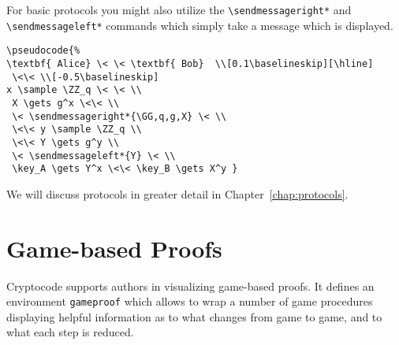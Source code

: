 \documentclass[a4paper]{report}
\begin{document}
For basic protocols you might also utilize the \lstinline$\sendmessageright*$ and \lstinline$\sendmessageleft*$
commands which simply take a message which is displayed.
\begin{center}
\end{center}
\begin{lstlisting}
\pseudocode{%
\textbf{ Alice} \< \< \textbf{ Bob}  \\[0.1\baselineskip][\hline]
 \<\< \\[-0.5\baselineskip]
x \sample \ZZ_q \< \< \\
 X \gets g^x \<\< \\
 \< \sendmessageright*{\GG,q,g,X} \< \\
 \<\< y \sample \ZZ_q \\
 \<\< Y \gets g^y \\
 \< \sendmessageleft*{Y} \< \\
 \key_A \gets Y^x \<\< \key_B \gets X^y }
\end{lstlisting}
We will discuss protocols in greater detail in Chapter~\ref{chap:protocols}.

\section{Game-based Proofs}
Cryptocode supports authors in visualizing game-based proofs. It defines an environment
\lstinline$gameproof$ which allows to wrap a number of game procedures displaying helpful
information as to what changes from game to game, and to what each step is reduced.
\end{document}
